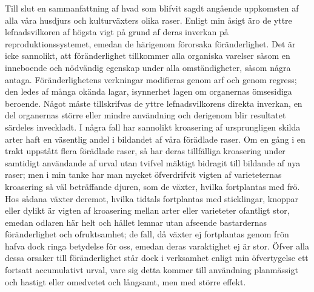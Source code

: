 Till slut en sammanfattning af hvad som blifvit sagdt angående uppkomsten af alla våra husdjurs och kulturväxters olika raser. Enligt min åsigt äro de yttre lefnadsvilkoren af högsta vigt på grund af deras inverkan på reproduktionssystemet, emedan de härigenom förorsaka föränderlighet. Det är icke sannolikt, att föränderlighet tillkommer alla organiska varelser såsom en inneboende och nödvändig egenskap under alla omständigheter, såsom några antaga. Föränderlighetens verkningar modifieras genom arf och genom regress; den ledes af många okända lagar, isynnerhet lagen om organernas ömsesidiga beroende. Något måste tillskrifvas de yttre lefnadsvilkorens direkta inverkan, en del organernas större eller mindre användning och derigenom blir resultatet särdeles inveckladt. I några fall har sannolikt kroasering af ursprungligen skilda arter haft en väsentlig andel i bildandet af våra förädlade raser. Om en gång i en trakt uppstått flera förädlade raser, så har deras tillfälliga kroasering under samtidigt användande af urval utan tvifvel mäktigt bidragit till bildande af nya raser; men i min tanke har man mycket öfverdrifvit vigten af varieteternas kroasering så väl beträffande djuren, som de växter, hvilka fortplantas med frö. Hos sådana växter deremot, hvilka tidtals fortplantas med sticklingar, knoppar eller dylikt är vigten af kroasering mellan arter eller varieteter ofantligt stor, emedan odlaren här helt och hållet lemnar utan afseende bastardernas föränderlighet och ofruktsamhet; de fall, då växter ej fortplantas genom frön hafva dock ringa betydelse för oss, emedan deras varaktighet ej är stor. Öfver alla dessa orsaker till föränderlighet står dock i verksamhet enligt min öfvertygelse ett fortsatt accumulativt urval, vare sig detta kommer till användning planmässigt och hastigt eller omedvetet och långsamt, men med större effekt.


